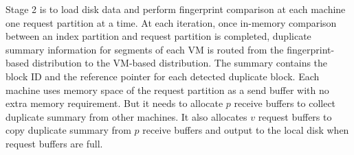 Stage  2 is to load disk data and perform fingerprint comparison at each machine one request partition at a time.
At each iteration, once in-memory comparison between an index partition and request partition is completed,
duplicate summary information for segments of each VM is routed from the fingerprint-based distribution  to the
VM-based distribution.  The summary contains the block ID and  the reference pointer for each detected duplicate block.
Each machine uses memory space of the request partition as a send buffer with no extra memory requirement.
But it needs to allocate $p$ receive buffers to collect duplicate summary from other machines.
It also allocates $v$ request buffers to copy duplicate summary from $p$ receive buffers and output to the local disk
when request buffers are full.


